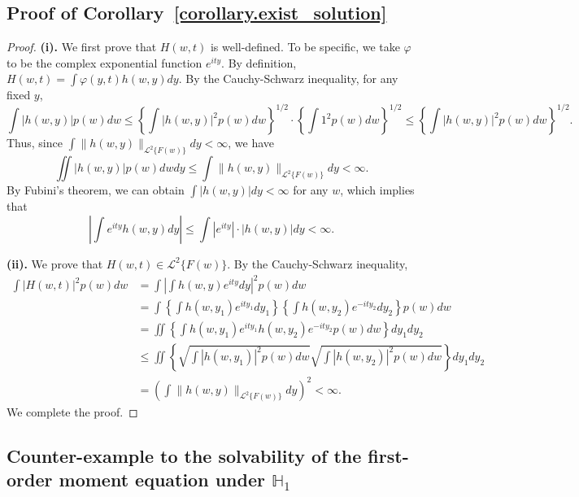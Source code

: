 \documentclass[
  12pt]{article}
\def\mH{\mathbb{H}}
\def\cL{\mathcal{L}}
\begin{document}
\subsection{Proof of Corollary~\ref{corollary.exist_solution}}
\solutioncossexist*
\begin{proof}
    \textbf{(i).} We first prove that $H(w,t)$ is well-defined. To be specific, we take $\varphi$ to be the complex exponential function $e^{ity}$. By definition, $H(w,t) =\int{\varphi (y,t)h(w,y)dy}$. By the Cauchy-Schwarz inequality, for any fixed $y$,
    $$
    \int |h(w,y)|p(w)dw \le \left\{\int |h(w,y)|^2 p(w) dw\right\}^{1/2}\cdot\left\{\int  1^2 p(w)dw\right\}^{1/2}\le \left\{\int |h(w,y)|^2 p(w) dw\right\}^{1/2}.
    $$
Thus, since  $\int \|h(w,y)\|_{\cL^2\{F(w)\}}dy<\infty$, we have
$$
\iint |h(w,y)|p(w)dwdy\le \int \|h(w,y)\|_{\cL^2\{F(w)\}}dy<\infty.
$$
By Fubini’s theorem, we can obtain $\int |h(w,y)|dy<\infty$ for any $w$, which implies that
$$
\left| \int{e^{ity}h(w,y)dy} \right|\le \int{|e^{ity}|\cdot |h(w,y)|dy}<\infty.
$$
    

\textbf{(ii).} We prove that $H(w,t)\in \mathcal{L}^2\{F(w)\}$. By the Cauchy-Schwarz inequality, 
\begin{equation}\label{eq.Ht_in_L2}
    \begin{aligned}
	\int{| H(w,t) |^2p(w) dw}&=\int\left| \int{h(w,y) e^{ity}dy} \right|^2p(w) dw\\
    &= \int\left\{ \int{h(w,y_1) e^{ity_1}dy_1} \right\}\left\{ \int{h(w,y_2) e^{-ity_2}dy_2} \right\}p(w) dw\\
    &=\iint \left\{\int h(w,y_1) e^{ity_1} h(w,y_2) e^{-ity_2} p(w) dw\right\} dy_1dy_2\\
    &\le\iint \left\{\sqrt{\int |h(w,y_1)|^2p(w)dw }\sqrt{\int |h(w,y_2)|^2p(w)dw }\right\}dy_1dy_2\\
    &=\left(\int \|h(w,y)\|_{\cL^2\{F(w)\}}dy \right)^2<\infty.
\end{aligned}
\end{equation}
We complete the proof. 
\end{proof}



\subsection{Counter-example to the solvability of the first-order moment equation under $\mH_1$}
\end{document}
